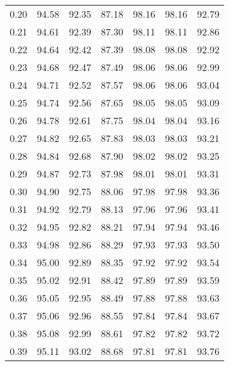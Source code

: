 \begin{tabular}{|c|c|c|c|c|c|c|}
      0.20 &     94.58 &     92.35 &      87.18 &   98.16 &      98.16 &         92.79 \\
      0.21 &     94.61 &     92.39 &      87.30 &   98.11 &      98.11 &         92.86 \\
      0.22 &     94.64 &     92.42 &      87.39 &   98.08 &      98.08 &         92.92 \\
      0.23 &     94.68 &     92.47 &      87.49 &   98.06 &      98.06 &         92.99 \\
      0.24 &     94.71 &     92.52 &      87.57 &   98.06 &      98.06 &         93.04 \\
      0.25 &     94.74 &     92.56 &      87.65 &   98.05 &      98.05 &         93.09 \\
      0.26 &     94.78 &     92.61 &      87.75 &   98.04 &      98.04 &         93.16 \\
      0.27 &     94.82 &     92.65 &      87.83 &   98.03 &      98.03 &         93.21 \\
      0.28 &     94.84 &     92.68 &      87.90 &   98.02 &      98.02 &         93.25 \\
      0.29 &     94.87 &     92.73 &      87.98 &   98.01 &      98.01 &         93.31 \\
      0.30 &     94.90 &     92.75 &      88.06 &   97.98 &      97.98 &         93.36 \\
      0.31 &     94.92 &     92.79 &      88.13 &   97.96 &      97.96 &         93.41 \\
      0.32 &     94.95 &     92.82 &      88.21 &   97.94 &      97.94 &         93.46 \\
      0.33 &     94.98 &     92.86 &      88.29 &   97.93 &      97.93 &         93.50 \\
      0.34 &     95.00 &     92.89 &      88.35 &   97.92 &      97.92 &         93.54 \\
      0.35 &     95.02 &     92.91 &      88.42 &   97.89 &      97.89 &         93.59 \\
      0.36 &     95.05 &     92.95 &      88.49 &   97.88 &      97.88 &         93.63 \\
      0.37 &     95.06 &     92.96 &      88.55 &   97.84 &      97.84 &         93.67 \\
      0.38 &     95.08 &     92.99 &      88.61 &   97.82 &      97.82 &         93.72 \\
      0.39 &     95.11 &     93.02 &      88.68 &   97.81 &      97.81 &         93.76 \\

\end{tabular}
